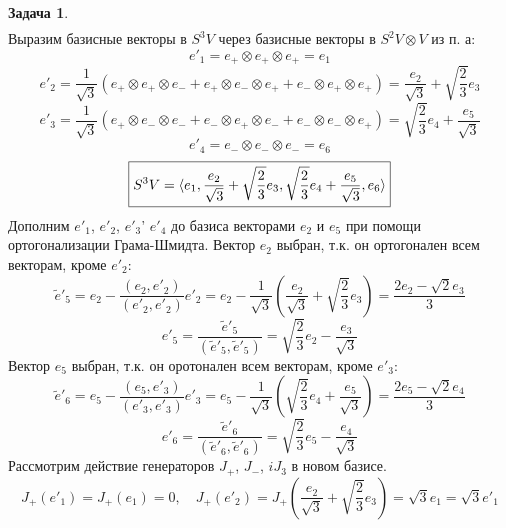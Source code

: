\documentclass[12pt]{article}
\theoremstyle{definition}
\newtheorem{zad}{Задача}[section]
\begin{document}
\begin{zad}
\begin{multline*}
\end{multline*}
Выразим базисные векторы в $S^3V$ через базисные векторы в $S^2V\otimes V$ из п. а:
\begin{equation}
e'_1=e_+\otimes e_+\otimes e_+=e_1
\end{equation}
\begin{equation}
e'_2=\frac{1}{\sqrt{3}}(e_+\otimes e_+\otimes e_-+e_+\otimes e_-\otimes e_++e_-\otimes e_+\otimes e_+)=\frac{e_2}{\sqrt{3}}+\sqrt{\frac{2}{3}}e_3
\end{equation}
\begin{equation}
e'_3=\frac{1}{\sqrt{3}}(e_+\otimes e_-\otimes e_-+e_-\otimes e_+\otimes e_-+e_-\otimes e_-\otimes e_+)=\sqrt{\frac{2}{3}}e_4+\frac{e_5}{\sqrt{3}}
\end{equation}
\begin{equation}
e'_4=e_-\otimes e_-\otimes e_-=e_6
\end{equation}
\begin{equation}
\boxed{S^3V=\braket{e_1,\frac{e_2}{\sqrt{3}}+\sqrt{\frac{2}{3}}e_3,\sqrt{\frac{2}{3}}e_4+\frac{e_5}{\sqrt{3}},e_6}}
\end{equation}
Дополним $e'_1$, $e'_2$, $e'_3$' $e'_4$ до базиса векторами $e_2$ и $e_5$ при помощи ортогонализации Грама-Шмидта. Вектор $e_2$ выбран, т.к. он ортогонален всем векторам, кроме $e'_2$:
\begin{equation}
    \tilde e'_5=e_2-\frac{(e_2,e'_2)}{(e'_2,e'_2)}e'_2=e_2-\frac{1}{\sqrt{3}}\left(\frac{e_2}{\sqrt{3}}+\sqrt{\frac{2}{3}}e_3\right)=\frac{2e_2-\sqrt{2}e_3}{3}
\end{equation}
\begin{equation}
    e'_5=\frac{\tilde e'_5}{(\tilde e'_5,\tilde e'_5)}=\sqrt{\frac{2}{3}}e_2-\frac{e_3}{\sqrt{3}}
\end{equation}
Вектор $e_5$ выбран, т.к. он оротонален всем векторам, кроме $e'_3$:
\begin{equation}
    \tilde e'_6=e_5-\frac{(e_5,e'_3)}{(e'_3,e'_3)}e'_3=e_5-\frac{1}{\sqrt{3}}\left(\sqrt{\frac{2}{3}}e_4+\frac{e_5}{\sqrt{3}}\right)=\frac{2e_5-\sqrt{2}e_4}{3}
\end{equation}
\begin{equation}
    e'_6=\frac{\tilde e'_6}{(\tilde e'_6,\tilde e'_6)}=\sqrt{\frac{2}{3}}e_5-\frac{e_4}{\sqrt{3}}
\end{equation}
Рассмотрим действие генераторов $J_+$, $J_-$, $iJ_3$ в новом базисе.
    \begin{equation}
        J_+(e'_1)=J_+(e_1)=0,\quad J_+(e'_2)=J_+\left(\frac{e_2}{\sqrt{3}}+\sqrt{\frac{2}{3}}e_3\right)=\sqrt{3}e_1=\sqrt{3}e'_1

\end{equation}
\end{zad}
\end{document}
